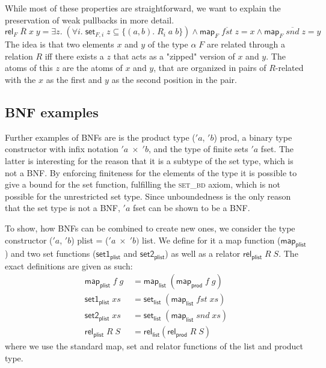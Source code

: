       While most of these properties are straightforward, we want to explain the preservation of weak pullbacks in more detail.
      \begin{equation}
        \textsf{rel}_F\; \overline{R}\; x\; y = 
          \exists z.\; (\forall i.\; \textsf{set}_{F,i}\; z \subseteq \{(a, b).\; R_i\; a\; b \}) \land 
          \textsf{map}_F\; \overline{fst}\; z = x \land \textsf{map}_F\; \overline{snd}\; z = y \label{eq:WP}
      \end{equation}
      The idea is that two elements $x$ and $y$ of the type $\alpha\; F$ are related through a relation $R$ iff there exists a $z$ that acts as a "zipped" version of $x$ and $y$. The atoms of this $z$ are the atoms of $x$ and $y$, that are organized in pairs of $R$-related with the $x$ as the first and $y$ as the second position in the pair.

    \subsection{BNF examples}
      Further examples of \acp{BNF} are is the product type \textsf{($'a$, $'b$) prod}, a binary type constructor with infix notation \textsf{$'a\; \times\; 'b$}, and the type of finite sets \textsf{$'a$ fset}. The latter is interesting for the reason that it is a subtype of the set type, which is not a \ac{BNF}. By enforcing finiteness for the elements of the type it is possible to give a bound for the set function, fulfilling the \textsc{set\_bd} axiom, which is not possible for the unrestricted set type. Since unboundedness is the only reason that the set type is not a \ac{BNF}, \textsf{$'a$ fset} can be shown to be a \ac{BNF}.
      
      To show, how \acp{BNF} can be combined to create new ones, we consider the type constructor \textsf{($'a$, $'b$) plist} = \textsf{($'a\; \times\; 'b)$ list}. We define for it a map function ($\textsf{map}_\textsf{plist}$) and two set functions ($\textsf{set1}_\textsf{plist}$ and $\textsf{set2}_\textsf{plist}$) as well as a relator $\textsf{rel}_\textsf{plist}\; R\; S$. The exact definitions are given as such:
      \begin{align*}
        \textsf{map}_\textsf{plist}\; f\; g\; &= \textsf{map}_\textsf{list}\; (\textsf{map}_\textsf{prod}\; f\; g)\\
        \textsf{set1}_\textsf{plist}\; xs &= \textsf{set}_\textsf{list}\; (\textsf{map}_\textsf{list}\; fst\; xs)\\
        \textsf{set2}_\textsf{plist}\; xs &= \textsf{set}_\textsf{list}\; (\textsf{map}_\textsf{list}\; snd\; xs)\\
        \textsf{rel}_\textsf{plist}\; R\; S &= \textsf{rel}_\textsf{list} (\textsf{rel}_\textsf{prod}\; R\; S)
      \end{align*}
      \noindent where we use the standard map, set and relator functions of the list and product type.

